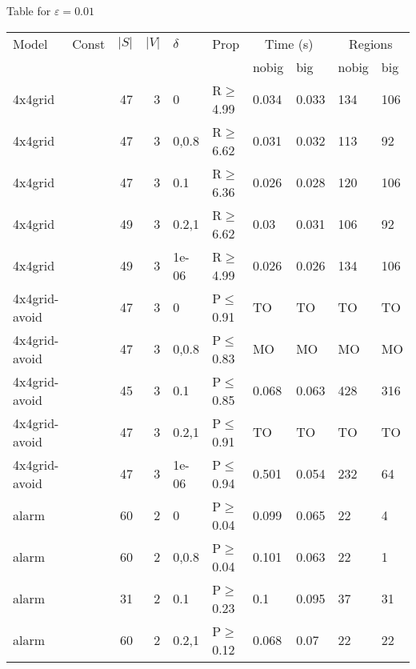 \small Table for \(\varepsilon=0.01\)
\begin{longtable}{llrrllllll}

        \toprule
        Model & Const & $|S|$ & $|V|$ & $\delta$ & Prop & \multicolumn{2}{c}{Time (s)} & \multicolumn{2}{c}{Regions} \\
        \cmidrule(ll){7-8} \cmidrule(ll){9-10}
        & & & & & & nobig & big & nobig & big \\
        \midrule
        
 4x4grid       &           &     	47 &   3 & 0     & R$\geq$4.99  & 0.034   & 0.033    & 134    & 106    \\
 4x4grid       &           &     	47 &   3 & 0,0.8 & R$\geq$6.62  & 0.031   & 0.032    & 113    & 92     \\
 4x4grid       &           &     	47 &   3 & 0.1   & R$\geq$6.36  & 0.026   & 0.028    & 120    & 106    \\
 4x4grid       &           &     	49 &   3 & 0.2,1 & R$\geq$6.62  & 0.03    & 0.031    & 106    & 92     \\
 4x4grid       &           &     	49 &   3 & 1e-06 & R$\geq$4.99  & 0.026   & 0.026    & 134    & 106    \\
 4x4grid-avoid &           &     	47 &   3 & 0     & P$\leq$0.91  & TO      & TO       & TO     & TO     \\
 4x4grid-avoid &           &     	47 &   3 & 0,0.8 & P$\leq$0.83  & MO      & MO       & MO     & MO     \\
 4x4grid-avoid &           &     	45 &   3 & 0.1   & P$\leq$0.85  & 0.068   & 0.063    & 428    & 316    \\
 4x4grid-avoid &           &     	47 &   3 & 0.2,1 & P$\leq$0.91  & TO      & TO       & TO     & TO     \\
 4x4grid-avoid &           &     	47 &   3 & 1e-06 & P$\leq$0.94  & 0.501   & 0.054    & 232    & 64     \\
 alarm         &           &     	60 &   2 & 0     & P$\geq$0.04  & 0.099   & 0.065    & 22     & 4      \\
 alarm         &           &     	60 &   2 & 0,0.8 & P$\geq$0.04  & 0.101   & 0.063    & 22     & 1      \\
 alarm         &           &     	31 &   2 & 0.1   & P$\geq$0.23  & 0.1     & 0.095    & 37     & 31     \\
 alarm         &           &     	60 &   2 & 0.2,1 & P$\geq$0.12  & 0.068   & 0.07     & 22     & 22     \\

\end{longtable}
